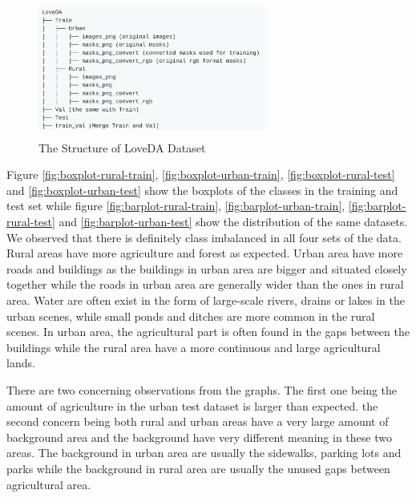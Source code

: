 \FloatBarrier
\begin{figure}[!h]
\includegraphics[width=7.5cm, height=4.5cm]{images/loveda-structure.png}
\centering
\caption{The Structure of LoveDA Dataset}
\label{fig:loveda-structure}
\end{figure}

Figure \ref{fig:boxplot-rural-train}, \ref{fig:boxplot-urban-train}, \ref{fig:boxplot-rural-test} and \ref{fig:boxplot-urban-test} show the boxplots of the classes in the training and test set while figure \ref{fig:barplot-rural-train}, \ref{fig:barplot-urban-train}, \ref{fig:barplot-rural-test} and \ref{fig:barplot-urban-test} show the distribution of the same datasets. We observed that there is definitely class imbalanced in all four sets of the data. Rural areas have more agriculture and forest as expected. Urban area have more roads and buildings as the buildings in urban area are bigger and situated closely together while the roads in urban area are generally wider than the ones in rural area. Water are often exist in the form of large-scale rivers, drains or lakes in the urban scenes, while small ponds and ditches are more common in the rural scenes. In urban area, the agricultural part is often found in the gaps between the buildings while the rural area have a more continuous and large agricultural lands.

There are two concerning observations from the graphs. The first one being the amount of agriculture in the urban test dataset is larger than expected. the second concern being both rural and urban areas have a very large amount of background area and the background have very different meaning in these two areas. The background in urban area are usually the sidewalks, parking lots and parks while the background in rural area are usually the unused gaps between agricultural area. 

